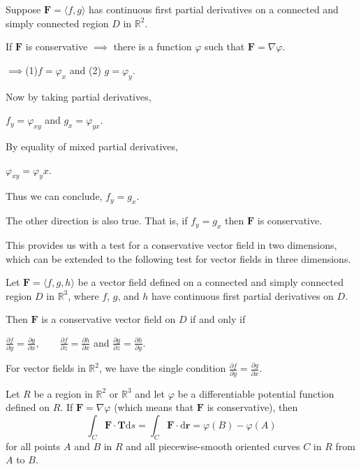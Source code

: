 \documentclass[../calc3.tex]{subfiles}
\begin{document}
\begin{definition}
    Suppose $\textbf{F}=\langle f,g\rangle$ has continuous first partial derivatives on a connected and simply connected region $D$ in $\mathbb{R}^2$.

    If $\textbf{F}$ is conservative $\implies$ there is a function $\varphi$ such that $\textbf{F}=\nabla \varphi$.
    \begin{center}
        $\implies$(1)$f=\varphi_x$ \qquad and \qquad (2) $g=\varphi_y$.
    \end{center}
    Now by taking partial derivatives,
    \begin{center}
        $f_y=\varphi_{xy}$ \qquad and \qquad $g_x = \varphi_{yx}$.
    \end{center}
    By equality of mixed partial derivatives, 
    \begin{center}
        $\varphi_{xy}=\varphi_yx$.
    \end{center}
    Thus we can conclude, $f_y=g_x$.

    The other direction is also true. That is, if $f_y=g_x$ then $\textbf{F}$ is conservative.

    This provides us with a test for a conservative vector field in two dimensions, which can be 
    extended to the following test for vector fields in three dimensions.
\end{definition}

\begin{theorem}
    Let $\textbf{F}=\langle f,g,h\rangle$ be a vector field defined on a connected and simply connected region $D$ in 
    $\mathbb{R}^3$, where $f$, $g$, and $h$ have continuous first partial derivatives on $D$.

    Then $\textbf{F}$ is a conservative vector field on $D$ if and only if 
    \begin{center}
        $\frac{\partial f}{\partial y}=\frac{\partial g}{\partial x}, \qquad \frac{\partial f}{\partial z}=\frac{\partial h}{\partial x}$ \qquad and \qquad $\frac{\partial g}{\partial z}=\frac{\partial h}{\partial y}$. 
    \end{center}
    For vector fields in $\mathbb{R}^2$, we have the single condition $\frac{\partial f}{\partial y}=\frac{\partial g}{\partial x}$.
\end{theorem}

\begin{theorem}
    Let $R$ be a region in $\mathbb{R}^2$ or $\mathbb{R}^3$ and let $\varphi$ be a differentiable potential function defined on $R$.
    If $\textbf{F}=\nabla\varphi$ (which means that $\textbf{F}$ is conservative), then 
    \[\int_C \textbf{F}\cdot\textbf{T}\mathrm{d}s=\int_C \textbf{F}\cdot \mathrm{d}\textbf{r}=\varphi(B)-\varphi(A)\]
    for all points $A$ and $B$ in $R$ and all piecewise-smooth oriented curves $C$ in $R$ from $A$ to $B$.
\end{theorem}
\end{document}
